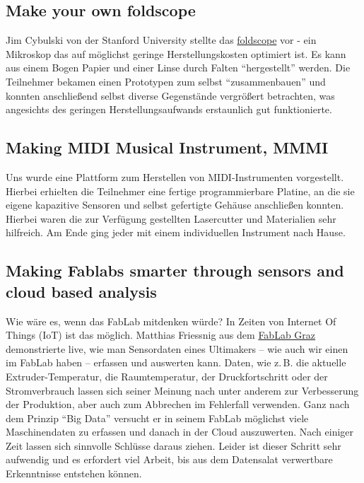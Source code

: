 \documentclass{\basedir/fablab-document}
\begin{document}
\subsection*{Make your own foldscope}

Jim Cybulski von der Stanford University stellte das \href{https://en.wikipedia.org/wiki/Foldscope}{foldscope}
vor - ein Mikroskop das auf
möglichst geringe Herstellungskosten optimiert ist. Es kann aus einem
Bogen Papier und einer Linse durch Falten \enquote{hergestellt} werden. Die
Teilnehmer bekamen einen Prototypen zum selbst \enquote{zusammenbauen} und
konnten anschließend selbst diverse Gegenstände vergrößert betrachten,
was angesichts des geringen Herstellungsaufwands erstaunlich gut
funktionierte.

\subsection*{Making MIDI Musical Instrument, MMMI}

Uns wurde eine Plattform zum Herstellen von MIDI-Instrumenten
vorgestellt. Hierbei erhielten die Teilnehmer eine fertige
programmierbare Platine, an die sie eigene kapazitive Sensoren und
selbst gefertigte Gehäuse anschließen konnten. Hierbei waren die zur
Verfügung gestellten Lasercutter und Materialien sehr hilfreich. Am Ende
ging jeder mit einem individuellen Instrument nach Hause.

\subsection*{Making Fablabs smarter through sensors and cloud based analysis}

Wie wäre es, wenn das FabLab mitdenken würde? In Zeiten von Internet Of
Things (IoT) ist das möglich. Matthias Friessnig aus dem
\href{http://fablab.tugraz.at/}{FabLab Graz} demonstrierte live, wie man
Sensordaten eines Ultimakers -- wie auch wir einen im FabLab haben --
erfassen und auswerten kann. Daten, wie z.\,B. die aktuelle Extruder-Temperatur,
die Raumtemperatur, der Druckfortschritt oder der
Stromverbrauch lassen sich seiner Meinung nach unter anderem zur
Verbesserung der Produktion, aber auch zum Abbrechen im Fehlerfall
verwenden. Ganz nach dem Prinzip \enquote{Big Data} versucht er in seinem
FabLab möglichst viele Maschinendaten zu erfassen und danach in der
Cloud auszuwerten. Nach einiger Zeit lassen sich sinnvolle Schlüsse
daraus ziehen. Leider ist dieser Schritt sehr aufwendig und es erfordert
viel Arbeit, bis aus dem Datensalat verwertbare Erkenntnisse entstehen können.
\end{document}
